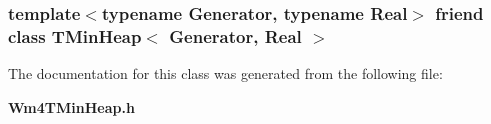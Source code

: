 \subsubsection{\setlength{\rightskip}{0pt plus 5cm}template$<$typename Generator, typename Real$>$ friend class {\bf TMin\-Heap}$<$ Generator, Real $>$\hspace{0.3cm}{\tt  [friend]}}\label{classWm4_1_1TMinHeapRecord_54c578fd08bed627b76136aaae458026}




The documentation for this class was generated from the following file:\begin{CompactItemize}
\item 
{\bf Wm4TMin\-Heap.h}\end{CompactItemize}

